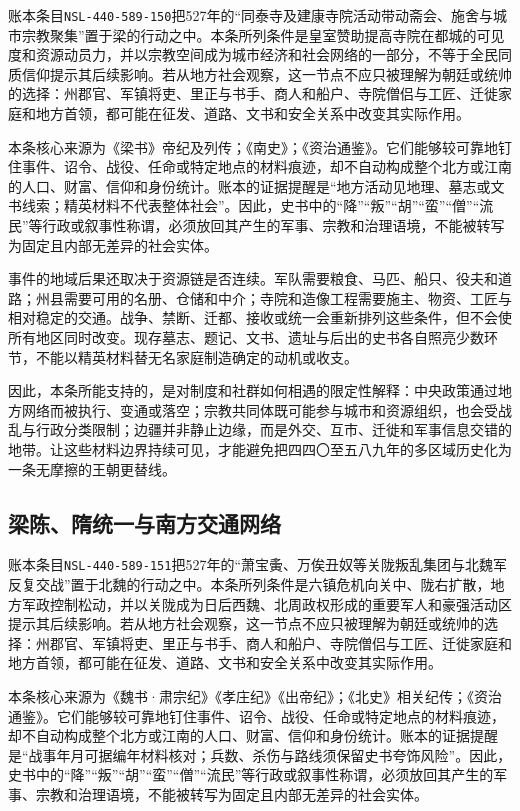 账本条目\texttt{NSL-440-589-150}把527年的“同泰寺及建康寺院活动带动斋会、施舍与城市宗教聚集”置于梁的行动之中。本条所列条件是皇室赞助提高寺院在都城的可见度和资源动员力，并以宗教空间成为城市经济和社会网络的一部分，不等于全民同质信仰提示其后续影响。若从地方社会观察，这一节点不应只被理解为朝廷或统帅的选择：州郡官、军镇将吏、里正与书手、商人和船户、寺院僧侣与工匠、迁徙家庭和地方首领，都可能在征发、道路、文书和安全关系中改变其实际作用。

本条核心来源为《梁书》帝纪及列传；《南史》；《资治通鉴》。它们能够较可靠地钉住事件、诏令、战役、任命或特定地点的材料痕迹，却不自动构成整个北方或江南的人口、财富、信仰和身份统计。账本的证据提醒是“地方活动见地理、墓志或文书线索；精英材料不代表整体社会”。因此，史书中的“降”“叛”“胡”“蛮”“僧”“流民”等行政或叙事性称谓，必须放回其产生的军事、宗教和治理语境，不能被转写为固定且内部无差异的社会实体。

事件的地域后果还取决于资源链是否连续。军队需要粮食、马匹、船只、役夫和道路；州县需要可用的名册、仓储和中介；寺院和造像工程需要施主、物资、工匠与相对稳定的交通。战争、禁断、迁都、接收或统一会重新排列这些条件，但不会使所有地区同时改变。现存墓志、题记、文书、遗址与后出的史书各自照亮少数环节，不能以精英材料替无名家庭制造确定的动机或收支。

因此，本条所能支持的，是对制度和社群如何相遇的限定性解释：中央政策通过地方网络而被执行、变通或落空；宗教共同体既可能参与城市和资源组织，也会受战乱与行政分类限制；边疆并非静止边缘，而是外交、互市、迁徙和军事信息交错的地带。让这些材料边界持续可见，才能避免把四四〇至五八九年的多区域历史化为一条无摩擦的王朝更替线。

\subsection{梁陈、隋统一与南方交通网络}

账本条目\texttt{NSL-440-589-151}把527年的“萧宝夤、万俟丑奴等关陇叛乱集团与北魏军反复交战”置于北魏的行动之中。本条所列条件是六镇危机向关中、陇右扩散，地方军政控制松动，并以关陇成为日后西魏、北周政权形成的重要军人和豪强活动区提示其后续影响。若从地方社会观察，这一节点不应只被理解为朝廷或统帅的选择：州郡官、军镇将吏、里正与书手、商人和船户、寺院僧侣与工匠、迁徙家庭和地方首领，都可能在征发、道路、文书和安全关系中改变其实际作用。

本条核心来源为《魏书·肃宗纪》《孝庄纪》《出帝纪》；《北史》相关纪传；《资治通鉴》。它们能够较可靠地钉住事件、诏令、战役、任命或特定地点的材料痕迹，却不自动构成整个北方或江南的人口、财富、信仰和身份统计。账本的证据提醒是“战事年月可据编年材料核对；兵数、杀伤与路线须保留史书夸饰风险”。因此，史书中的“降”“叛”“胡”“蛮”“僧”“流民”等行政或叙事性称谓，必须放回其产生的军事、宗教和治理语境，不能被转写为固定且内部无差异的社会实体。

